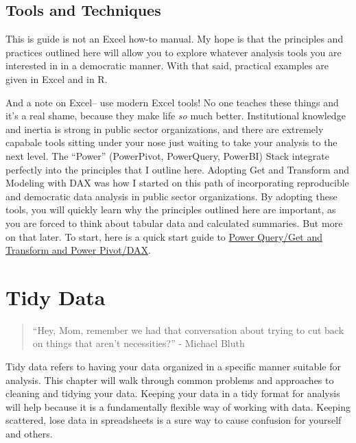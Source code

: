 \documentclass[]{book}
\begin{document}
\hypertarget{tools-and-techniques}{%
\section{Tools and Techniques}\label{tools-and-techniques}}

This is guide is not an Excel how-to manual. My hope is that the principles and practices outlined here will allow you to explore whatever analysis tools you are interested in in a democratic manner. With that said, practical examples are given in Excel and in R.

And a note on Excel-- use modern Excel tools! No one teaches these things and it's a real shame, because they make life \emph{so} much better. Institutional knowledge and inertia is strong in public sector organizations, and there are extremely capabale tools sitting under your nose just waiting to take your analysis to the next level. The ``Power'' (PowerPivot, PowerQuery, PowerBI) Stack integrate perfectly into the principles that I outline here. Adopting Get and Transform and Modeling with DAX was how I started on this path of incorporating reproducible and democratic data analysis in public sector organizations. By adopting these tools, you will quickly learn why the principles outlined here are important, as you are forced to think about tabular data and calculated summaries. But more on that later. To start, here is a quick start guide to \href{https://support.office.com/en-us/article/get-started-with-power-pivot-in-microsoft-excel-fdfcf944-7876-424a-8437-1a6c1043a80b}{Power Query/Get and Transform and Power Pivot/DAX}.

\hypertarget{tidy-data}{%
\chapter{Tidy Data}\label{tidy-data}}

\begin{quote}
``Hey, Mom, remember we had that conversation about trying to cut back on things that aren't necessities?'' - Michael Bluth
\end{quote}

Tidy data refers to having your data organized in a specific manner suitable for analysis. This chapter will walk through common problems and approaches to cleaning and tidying your data. Keeping your data in a tidy format for analysis will help because it is a fundamentally flexible way of working with data. Keeping scattered, lose data in spreadsheets is a sure way to cause confusion for yourself and others.
\end{document}
